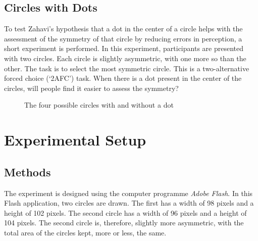 \documentclass[a4paper,12pt]{article}
\numberwithin{equation}{section}
\begin{document}
\subsection{Circles with Dots}
\label{sec:Circles with Dots}

To test Zahavi's hypothesis that a dot in the center of a circle helps with the assessment of the symmetry of that circle by reducing errors in perception, a short experiment is performed. In this experiment, participants are presented with two circles. Each circle is slightly asymmetric, with one more so than the other. The task is to select the most symmetric circle. This is a two-alternative forced choice (`2AFC') task. When there is a dot present in the center of the circles, will people find it easier to assess the symmetry?
\begin{figure}[!h]
\begin{center}
\captionsetup[subfigure]{width=30mm}
\hspace{6mm}
\hspace{6mm}
\hspace{6mm}
\caption{The four possible circles with and without a dot}
\label{fig:Experiment 1/Figure 1234}
\end{center}
\end{figure}

\newpage\clearpage


\section{Experimental Setup}
\label{sec:Experimental Setup}
\subsection{Methods}
\label{sec:Methods}

The experiment is designed using the computer programme \textit{Adobe Flash}. In this Flash application, two circles are drawn. The first has a width of 98 pixels and a height of 102 pixels. The second circle has a width of 96 pixels and a height of 104 pixels. The second circle is, therefore, slightly more asymmetric, with the total area of the circles kept, more or less, the same.
\end{document}
